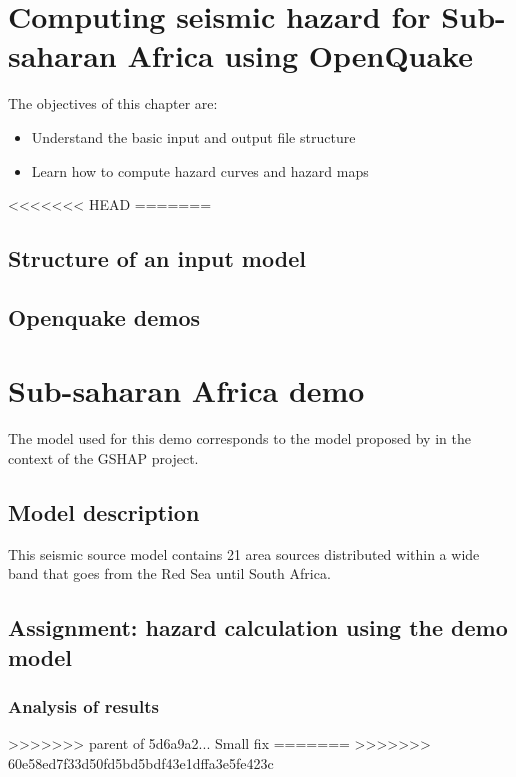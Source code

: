 \documentclass[11pt,a4paper,headings=small,dvips]{scrbook}
\newenvironment{myfancybox}{%
  \def\FrameCommand{\fboxsep=\FrameSep \fcolorbox{blue01}{honeydew}}%
  \color{black}\MakeFramed {\FrameRestore}}%
 {\endMakeFramed}
\begin{document}
\chapter{Computing seismic hazard for Sub-saharan Africa using OpenQuake}
\begin{myfancybox}
The objectives of this chapter are:
\begin{itemize}
    \item Understand the basic input and output file structure
    \item Learn how to compute hazard curves and hazard maps
\end{itemize}
\end{myfancybox}
    
<<<<<<< HEAD
=======
\section{Structure of an input model}
\section{Openquake demos}
\cleardoublepage
\chapter{Sub-saharan Africa demo}
The model used for this demo corresponds to the model proposed by 
\citet{midzi1999} in the context of the GSHAP project.
\section{Model description}
This seismic source model contains 21 area sources distributed within a wide 
band that goes from the Red Sea until South Africa.
\section{Assignment: hazard calculation using the demo model}
\subsection{Analysis of results}
\cleardoublepage
>>>>>>> parent of 5d6a9a2... Small fix
=======
>>>>>>> 60e58ed7f33d50fd5bd5bdf43e1dffa3e5fe423c
\end{document}
